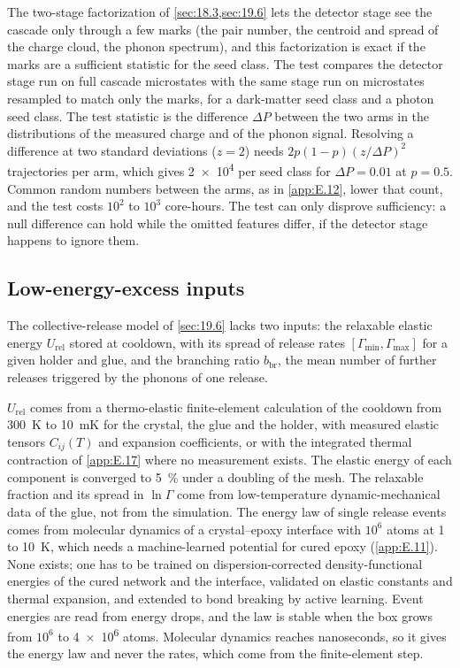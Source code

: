 The two-stage factorization of \cref{sec:18.3,sec:19.6} lets the detector stage see the cascade only through a few marks (the pair number, the centroid and spread of the charge cloud, the phonon spectrum), and this factorization is exact if the marks are a sufficient statistic for the seed class. The test compares the detector stage run on full cascade microstates with the same stage run on microstates resampled to match only the marks, for a dark-matter seed class and a photon seed class. The test statistic is the difference $\Delta P$ between the two arms in the distributions of the measured charge and of the phonon signal. Resolving a difference at two standard deviations ($z = 2$) needs $2p(1 - p)(z/\Delta P)^2$ trajectories per arm, which gives \num{2e4} per seed class for $\Delta P = 0.01$ at $p = 0.5$. Common random numbers between the arms, as in \cref{app:E.12}, lower that count, and the test costs $10^{2}$ to $10^{3}$ core-hours. The test can only disprove sufficiency: a null difference can hold while the omitted features differ, if the detector stage happens to ignore them.

\subsection{Low-energy-excess inputs}

The collective-release model of \cref{sec:19.6} lacks two inputs: the relaxable elastic energy $U_{\mathrm{rel}}$ stored at cooldown, with its spread of release rates $[\varGamma_{\min}, \varGamma_{\max}]$ for a given holder and glue, and the branching ratio $b_{\mathrm{br}}$, the mean number of further releases triggered by the phonons of one release.

$U_{\mathrm{rel}}$ comes from a thermo-elastic finite-element calculation of the cooldown from \SI{300}{K} to \SI{10}{mK} for the crystal, the glue and the holder, with measured elastic tensors $C_{ij}(T)$ and expansion coefficients, or with the integrated thermal contraction of \cref{app:E.17} where no measurement exists. The elastic energy of each component is converged to \SI{5}{\percent} under a doubling of the mesh. The relaxable fraction and its spread in $\ln\varGamma$ come from low-temperature dynamic-mechanical data of the glue, not from the simulation. The energy law of single release events comes from molecular dynamics of a crystal--epoxy interface with $10^6$ atoms at 1 to \SI{10}{K}, which needs a machine-learned potential for cured epoxy (\cref{app:E.11}). None exists; one has to be trained on dispersion-corrected density-functional energies of the cured network and the interface, validated on elastic constants and thermal expansion, and extended to bond breaking by active learning. Event energies are read from energy drops, and the law is stable when the box grows from $10^6$ to \num{4e6} atoms. Molecular dynamics reaches nanoseconds, so it gives the energy law and never the rates, which come from the finite-element step.

